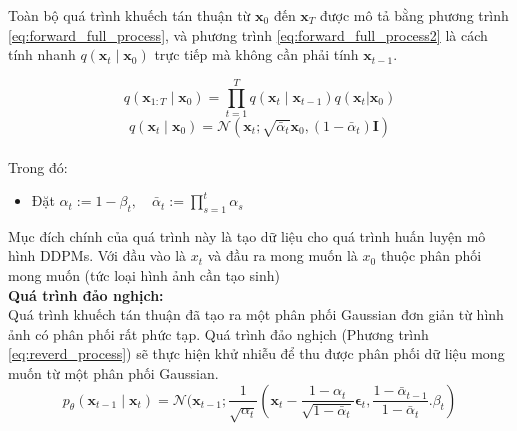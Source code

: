 Toàn bộ quá trình khuếch tán thuận từ \(\mathbf{x}_0\) đến \(\mathbf{x}_T\) được mô tả bằng phương trình \ref{eq:forward_full_process}, và phương trình \ref{eq:forward_full_process2} là cách tính nhanh $q(\mathbf{x}_t \mid \mathbf{x}_0)$ trực tiếp mà không cần phải tính $\mathbf{x}_{t-1}$.

\begin{equation}
	q(\mathbf{x}_{1:T} \mid \mathbf{x}_0) = \prod_{t=1}^{T} q(\mathbf{x}_t \mid \mathbf{x}_{t-1})
	q(\mathbf{x}_t|\mathbf{x}_0)
	\label{eq:forward_full_process}
\end{equation}
%
\begin{equation}
	q(\mathbf{x}_t \mid \mathbf{x}_0) = \mathcal{N}(\mathbf{x}_t; \sqrt{\bar{\alpha}_t}\mathbf{x}_0,(1-\bar{\alpha}_t)\mathbf{I})
	\label{eq:forward_full_process2}
\end{equation} \\
%
Trong đó:
\begin{itemize}
	\item Đặt $\alpha_t := 1-\beta_t, \quad \bar\alpha_t := \prod_{s=1}^{t}\alpha_s$
\end{itemize}
%
Mục đích chính của quá trình này là tạo dữ liệu cho quá trình huấn luyện mô hình DDPMs. Với đầu vào là \(x_t\) và đầu ra mong muốn là \({x}_0\) thuộc phân phối mong muốn (tức loại hình ảnh cần tạo sinh)\\
%
\textbf{Quá trình đảo nghịch:}\\
%
Quá trình khuếch tán thuận đã tạo ra một phân phối Gaussian đơn giản từ hình ảnh có phân phối rất phức tạp. Quá trình đảo nghịch (Phương trình \ref{eq:reverd_process}) sẽ thực hiện khử nhiễu để thu được phân phối dữ liệu mong muốn từ một phân phối Gaussian.
%
\begin{equation}
	\mathit{p_\theta}(\mathbf{x}_{t-1} \mid \mathbf{x}_t) = \mathcal{N}(\mathbf{x}_{t-1}; \frac{1}{\sqrt{\alpha_t}}(\mathbf{x}_t - \frac{1-\alpha_t}{\sqrt{1-\bar\alpha_t}}\mathbf{\epsilon}_t, \frac{1-\bar\alpha_{t-1} }{1-\bar\alpha_t}.\beta_t)
	\label{eq:reverd_process}
\end{equation}
%

